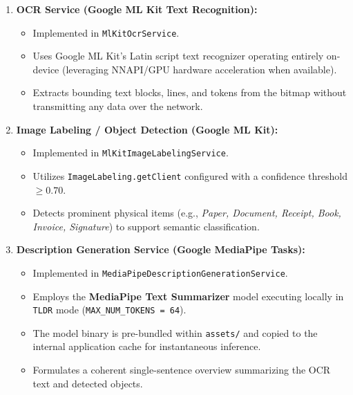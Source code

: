 \begin{enumerate}[label=\textbf{4.1.\arabic*.}]
    \item \textbf{OCR Service (Google ML Kit Text Recognition):}
    \begin{itemize}
        \item Implemented in \texttt{MlKitOcrService}.
        \item Uses Google ML Kit's Latin script text recognizer operating entirely on-device (leveraging NNAPI/GPU hardware acceleration when available).
        \item Extracts bounding text blocks, lines, and tokens from the bitmap without transmitting any data over the network.
    \end{itemize}

    \item \textbf{Image Labeling / Object Detection (Google ML Kit):}
    \begin{itemize}
        \item Implemented in \texttt{MlKitImageLabelingService}.
        \item Utilizes \texttt{ImageLabeling.getClient} configured with a confidence threshold $\ge 0.70$.
        \item Detects prominent physical items (e.g., \textit{Paper, Document, Receipt, Book, Invoice, Signature}) to support semantic classification.
    \end{itemize}

    \item \textbf{Description Generation Service (Google MediaPipe Tasks):}
    \begin{itemize}
        \item Implemented in \texttt{MediaPipeDescriptionGenerationService}.
        \item Employs the \textbf{MediaPipe Text Summarizer} model executing locally in \texttt{TLDR} mode (\texttt{MAX\_NUM\_TOKENS = 64}).
        \item The model binary is pre-bundled within \texttt{assets/} and copied to the internal application cache for instantaneous inference.
        \item Formulates a coherent single-sentence overview summarizing the OCR text and detected objects.
    \end{itemize}


\end{enumerate}
